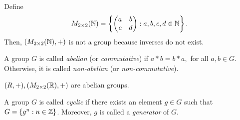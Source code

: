 \begin{noneg}
    Define
    \[
        M_{2\times 2}(\mathbb{N}) = \left\{\begin{pmatrix}a & b\\c & d\end{pmatrix}: a,b,c,d\in\mathbb{N}\right\}.
    \]
    Then, $(M_{2\times 2}(\mathbb{N}), +)$ is not a group because inverses do not exist.
\end{noneg}
\begin{definition}
A group $G$ is called \textit{abelian} (or \textit{commutative}) if $a * b = b * a,$ for all $a, b \in G$. Otherwise, it is called \textit{non-abelian} (or \textit{non-commutative}).
\end{definition}
\begin{eg}
    $(R, +), (M_{2\times 2}(\mathbb{R}), +)$ are abelian groups.
\end{eg}

\begin{definition}\label{def:cyclic}
    A group $G$ is called \textit{cyclic} if there exists an element $g \in G$ such that $G = \{g^n: n \in \mathbb{Z}\}$. Moreover, $g$ is called a \textit{generator} of $G$.
\end{definition}

